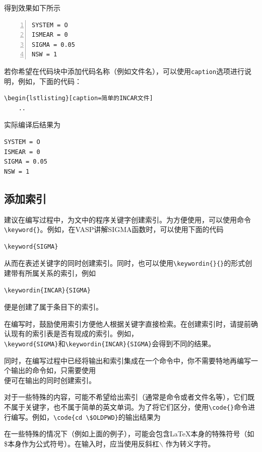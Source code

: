 得到效果如下所示

\begin{lstlisting}[numbers=left]
SYSTEM = O
ISMEAR = 0
SIGMA = 0.05
NSW = 1
\end{lstlisting}

\begin{attention}
    若你希望在代码块中添加代码名称（例如文件名），可以使用\verb|caption|选项进行说明，例如，下面的代码：
    \begin{lstlisting}[frame=line]
\begin{lstlisting}[caption=简单的INCAR文件]
    ..        
    \end{lstlisting}

    实际编译后结果为
    \begin{lstlisting}[caption=简单的INCAR文件]
SYSTEM = O
ISMEAR = 0
SIGMA = 0.05
NSW = 1
    \end{lstlisting}

\end{attention}

\subsection{添加索引}

建议在编写过程中，为文中的程序关键字创建索引。为方便使用，可以使用命令\verb|\keyword{}|。例如，在VASP讲解SIGMA函数时，可以使用下面的代码

\begin{lstlisting}[frame=line]
\keyword{SIGMA}
\end{lstlisting}

从而在表述关键字的同时创建索引。同时，也可以使用\verb|\keywordin{}{}|的形式创建带有所属关系的索引，例如

\begin{lstlisting}[frame=line]
\keywordin{INCAR}{SIGMA}
\end{lstlisting}

便是创建了属于条目下的索引。

\begin{attention}
    在编写时，鼓励使用索引方便他人根据关键字直接检索。在创建索引时，请提前确认现有的索引表是否有现成的索引。例如，\\\verb|\keyword{SIGMA}|和\verb|\keywordin{INCAR}{SIGMA}|会得到不同的结果。

    同时，在编写过程中已经将输出和索引集成在一个命令中，你不需要特地再编写一个输出的命令如，只需要使用\\便可在输出的同时创建索引。
\end{attention}

对于一些特殊的内容，可能不希望给出索引（通常是命令或者文件名等），它们既不属于关键字，也不属于简单的英文单词。为了将它们区分，使用\verb|\code{}|命令进行编写。例如，\verb|\code{cd \$OLDPWD}|的输出结果为

\begin{attention}
    在一些特殊的情况下（例如上面的例子），可能会包含\LaTeX 本身的特殊符号（如\$本身作为公式符号）。在输入时，应当使用反斜杠$\backslash$ 作为转义字符。
\end{attention}
